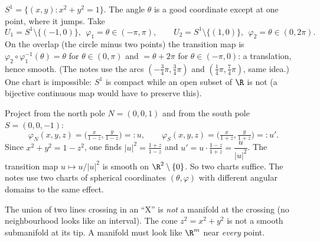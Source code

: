 \begin{example}
$S^1=\{(x,y):x^2+y^2=1\}$. The angle $\theta$ is a good coordinate except at one point, where it jumps. Take
\[
U_1=S^1\setminus\{(-1,0)\},\ \ \varphi_1=\theta\in(-\pi,\pi),\qquad
U_2=S^1\setminus\{(1,0)\},\ \ \varphi_2=\theta\in(0,2\pi).
\]
On the overlap (the circle minus two points) the transition map is $\varphi_2\circ\varphi_1^{-1}(\theta)=\theta$ for $\theta\in(0,\pi)$ and $=\theta+2\pi$ for $\theta\in(-\pi,0)$: a translation, hence smooth. (The notes use the arcs $(-\tfrac34\pi,\tfrac34\pi)$ and $(\tfrac14\pi,\tfrac74\pi)$, same idea.) One chart is impossible: $S^1$ is compact while an open subset of $\R$ is not (a bijective continuous map would have to preserve this).
\end{example}

\begin{example}
Project from the north pole $N=(0,0,1)$ and from the south pole $S=(0,0,-1)$:
\[
\varphi_N(x,y,z)=\Big(\tfrac{x}{1-z},\tfrac{y}{1-z}\Big)=:u,\qquad
\varphi_S(x,y,z)=\Big(\tfrac{x}{1+z},\tfrac{y}{1+z}\Big)=:u'.
\]
Since $x^2+y^2=1-z^2$, one finds $|u|^2=\frac{1+z}{1-z}$ and $u'=u\cdot\frac{1-z}{1+z}=\dfrac{u}{|u|^2}$.
The transition map $u\mapsto u/|u|^2$ is smooth on $\R^2\setminus\{0\}$. So two charts suffice. The notes use two charts of spherical coordinates $(\theta,\varphi)$ with different angular domains to the same effect.
\end{example}

\begin{pitfall}
The union of two lines crossing in an ``X'' is \emph{not} a manifold at the crossing (no neighbourhood looks like an interval). The cone $z^2=x^2+y^2$ is not a smooth submanifold at its tip. A manifold must look like $\R^m$ near \emph{every} point.
\end{pitfall}
